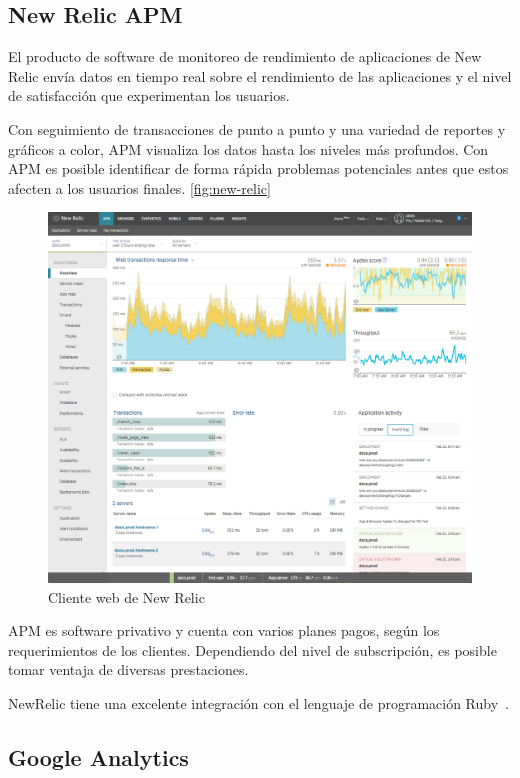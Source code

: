 \subsection{New Relic APM}

El producto de software de monitoreo de rendimiento de aplicaciones de New
Relic envía datos en tiempo real sobre el rendimiento de las aplicaciones  y
el nivel de satisfacción que experimentan los usuarios.

Con seguimiento de transacciones de punto a punto y una variedad de reportes y
gráficos a color, APM visualiza los datos hasta los niveles más profundos. Con
APM es posible identificar de forma rápida problemas potenciales antes que
estos afecten a los usuarios finales. \autoref{fig:new-relic}


\begin{figure}
  \includegraphics[width=\linewidth]{src/images/anexos/newrelic.png}
  \caption{Cliente web de New Relic}
  \label{fig:new-relic}
\end{figure}


APM es software privativo y cuenta con varios planes pagos, según los
requerimientos de los clientes. Dependiendo del nivel de subscripción, es
posible tomar ventaja de diversas prestaciones.

NewRelic tiene una excelente integración con el lenguaje de programación
Ruby~\cite{newrelic}.

\subsection{Google Analytics}

